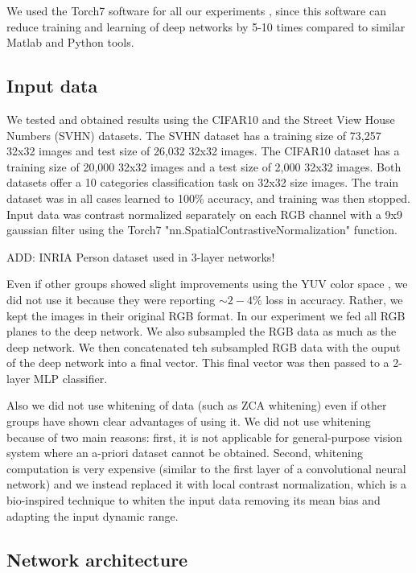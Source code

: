 \documentclass{article} %
\begin{document}
We used the Torch7 software for all our experiments \cite{collobert_torch7_2011}, since this software can reduce training and learning of deep networks by 5-10 times compared to similar Matlab and Python tools.


\subsection{Input data}

We tested and obtained results using the CIFAR10 \cite{krizhevsky_learning_2009} and the Street View House Numbers (SVHN) \cite{netzer_reading_2011} datasets. The SVHN dataset has a training size of 73,257 32x32 images and test size of 26,032 32x32 images. The CIFAR10 dataset has a training size of 20,000 32x32 images and a test size of 2,000 32x32 images. Both datasets offer a 10 categories classification task on 32x32 size images. The train dataset was in all cases learned to 100\% accuracy, and training was then stopped. Input data was contrast normalized separately on each RGB channel with a 9x9 gaussian filter using the Torch7 "nn.SpatialContrastiveNormalization" function.

ADD: INRIA Person dataset used in 3-layer networks!

Even if other groups showed slight improvements using the YUV color space \cite{jarrett_what_2009}, we did not use it because they were reporting $\sim 2-4\%$ loss in accuracy. Rather, we kept the images in their original RGB format. In our experiment we fed all RGB planes to the deep network. We also subsampled the RGB data as much as the deep network. We then concatenated teh subsampled RGB data with the ouput of the deep network into a final vector. This final vector was then passed to a 2-layer MLP classifier.

Also we did not use whitening of data (such as ZCA whitening) even if other groups have shown clear advantages of using it.  We did not use whitening because of two main reasons: first, it is not applicable for general-purpose vision system where an a-priori dataset cannot be obtained. Second, whitening computation is very expensive (similar to the first layer of a convolutional neural network) and we instead replaced it with local contrast normalization, which is a bio-inspired technique to whiten the input data removing its mean bias and adapting the input dynamic range.



\subsection{Network architecture}
\label{sec-net-arch}
\end{document}
